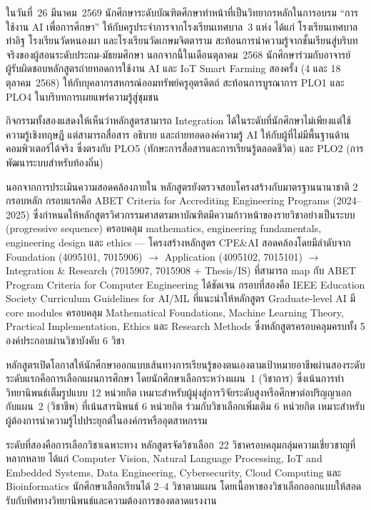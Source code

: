 ในวันที่~26 มีนาคม~2569 นักศึกษาระดับบัณฑิตศึกษาทำหน้าที่เป็นวิทยากรหลักในการอบรม ``การใช้งาน AI เพื่อการศึกษา'' ให้กับครูประจำการจากโรงเรียนเทศบาล~3 แห่ง ได้แก่ โรงเรียนเทศบาลท่าอิฐ โรงเรียนวัดหนองผา และโรงเรียนวัดเกษมจิตตาราม สะท้อนการนำความรู้จากชั้นเรียนสู่บริบทจริงของผู้สอนระดับประถม-มัธยมศึกษา นอกจากนี้ในเดือนตุลาคม~2568 นักศึกษาร่วมกับอาจารย์ผู้รับผิดชอบหลักสูตรถ่ายทอดการใช้งาน AI และ IoT Smart Farming สองครั้ง (4 และ 18 ตุลาคม~2568) ให้กับบุคลากรสหกรณ์ออมทรัพย์ครูอุตรดิตถ์ สะท้อนการบูรณาการ PLO1 และ PLO4 ในบริบทการเผยแพร่ความรู้สู่ชุมชน

กิจกรรมทั้งสองแสดงให้เห็นว่าหลักสูตรสามารถ Integration ได้ในระดับที่นักศึกษาไม่เพียงแต่ใช้ความรู้เชิงทฤษฎี แต่สามารถสื่อสาร อธิบาย และถ่ายทอดองค์ความรู้ AI ให้กับผู้ที่ไม่มีพื้นฐานด้านคอมพิวเตอร์ได้จริง ซึ่งตรงกับ PLO5 (ทักษะการสื่อสารและการเรียนรู้ตลอดชีวิต) และ PLO2 (การพัฒนาระบบสำหรับท้องถิ่น)

นอกจากการประเมินความสอดคล้องภายใน หลักสูตรยังตรวจสอบโครงสร้างกับมาตรฐานนานาชาติ 2 กรอบหลัก กรอบแรกคือ ABET Criteria for Accrediting Engineering Programs (2024--2025) ซึ่งกำหนดให้หลักสูตรวิศวกรรมศาสตรมหาบัณฑิตมีความก้าวหน้าของรายวิชาอย่างเป็นระบบ (progressive sequence) ครอบคลุม mathematics, engineering fundamentals, engineering design และ ethics --- โครงสร้างหลักสูตร CPE\&AI สอดคล้องโดยมีลำดับจาก Foundation (4095101, 7015906) $\rightarrow$ Application (4095102, 7015101) $\rightarrow$ Integration \& Research (7015907, 7015908 + Thesis/IS) ที่สามารถ map กับ ABET Program Criteria for Computer Engineering ได้ชัดเจน กรอบที่สองคือ IEEE Education Society Curriculum Guidelines for AI/ML ที่แนะนำให้หลักสูตร Graduate-level AI มี core modules ครอบคลุม Mathematical Foundations, Machine Learning Theory, Practical Implementation, Ethics และ Research Methods ซึ่งหลักสูตรครอบคลุมครบทั้ง 5 องค์ประกอบผ่านวิชาบังคับ 6 วิชา


หลักสูตรเปิดโอกาสให้นักศึกษาออกแบบเส้นทางการเรียนรู้ของตนเองตามเป้าหมายอาชีพผ่านสองระดับ ระดับแรกคือการเลือกแผนการศึกษา โดยนักศึกษาเลือกระหว่างแผน~1 (วิชาการ) ซึ่งเน้นการทำวิทยานิพนธ์เต็มรูปแบบ 12 หน่วยกิต เหมาะสำหรับผู้มุ่งสู่การวิจัยระดับสูงหรือศึกษาต่อปริญญาเอก กับแผน~2 (วิชาชีพ) ที่เน้นสารนิพนธ์ 6 หน่วยกิต ร่วมกับวิชาเลือกเพิ่มเติม 6 หน่วยกิต เหมาะสำหรับผู้ต้องการนำความรู้ไปประยุกต์ในองค์กรหรืออุตสาหกรรม

ระดับที่สองคือการเลือกวิชาเฉพาะทาง หลักสูตรจัดวิชาเลือก~22 วิชาครอบคลุมกลุ่มความเชี่ยวชาญที่หลากหลาย ได้แก่ Computer Vision, Natural Language Processing, IoT and Embedded Systems, Data Engineering, Cybersecurity, Cloud Computing และ Bioinformatics นักศึกษาเลือกเรียนได้ 2--4 วิชาตามแผน โดยเนื้อหาของวิชาเลือกออกแบบให้สอดรับกับทิศทางวิทยานิพนธ์และความต้องการของตลาดแรงงาน

